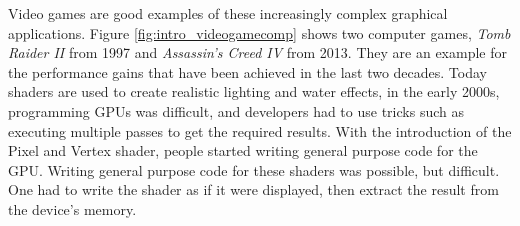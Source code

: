 Video games are good examples of these increasingly complex graphical applications. Figure \ref{fig:intro_videogamecomp} shows two computer games, \textit{Tomb Raider II} from 1997 and \textit{Assassin's Creed IV} from 2013. They are an example for the performance gains that have been achieved in the last two decades. Today shaders are used to create realistic lighting and water effects, in the early 2000s, programming GPUs was difficult, and developers had to use tricks such as executing multiple passes to get the required results. With the introduction of the Pixel and Vertex shader, people started writing general purpose code for the GPU. Writing general purpose code for these shaders was possible, but difficult. One had to write the shader as if it were displayed, then extract the result from the device's memory. \cite{jalili2010simd,blythe2008rise} \\

